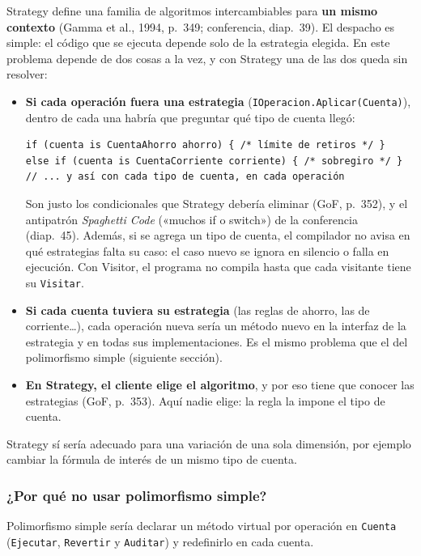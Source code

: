 Strategy define una familia de algoritmos intercambiables para \textbf{un mismo contexto}
(Gamma et al., 1994, p.~349; conferencia, diap.~39). El despacho es simple: el código que se
ejecuta depende solo de la estrategia elegida. En este problema depende de dos cosas a la
vez, y con Strategy una de las dos queda sin resolver:

\begin{itemize}
  \item \textbf{Si cada operación fuera una estrategia} (\texttt{IOperacion.Aplicar(Cuenta)}),
        dentro de cada una habría que preguntar qué tipo de cuenta llegó:
\begin{lstlisting}[basicstyle=\ttfamily\footnotesize, columns=fullflexible, keepspaces=true]
if (cuenta is CuentaAhorro ahorro) { /* límite de retiros */ }
else if (cuenta is CuentaCorriente corriente) { /* sobregiro */ }
// ... y así con cada tipo de cuenta, en cada operación
\end{lstlisting}
        Son justo los condicionales que Strategy debería eliminar (GoF, p.~352), y el
        antipatrón \emph{Spaghetti Code} («muchos if o switch») de la conferencia (diap.~45).
        Además, si se agrega un tipo de cuenta, el compilador no avisa en qué estrategias
        falta su caso: el caso nuevo se ignora en silencio o falla en ejecución. Con Visitor, el programa no compila
        hasta que cada visitante tiene su \texttt{Visitar}.
  \item \textbf{Si cada cuenta tuviera su estrategia} (las reglas de ahorro, las de
        corriente\ldots), cada operación nueva sería un método nuevo en la interfaz de la
        estrategia y en todas sus implementaciones. Es el mismo problema que el del
        polimorfismo simple (siguiente sección).
  \item \textbf{En Strategy, el cliente elige el algoritmo}, y por eso tiene que conocer las
        estrategias (GoF, p.~353). Aquí nadie elige: la regla la impone el tipo de cuenta.
\end{itemize}

Strategy sí sería adecuado para una variación de una sola dimensión, por ejemplo cambiar la
fórmula de interés de un mismo tipo de cuenta.

\subsubsection{¿Por qué no usar polimorfismo simple?}

Polimorfismo simple sería declarar un método virtual por operación en \texttt{Cuenta}
(\texttt{Ejecutar}, \texttt{Revertir} y \texttt{Auditar}) y redefinirlo en cada cuenta.

